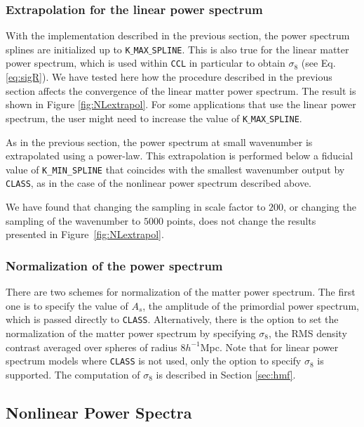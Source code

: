 \documentclass[\docopts]{\docclass}
\newcommand{\ccl}{{\tt CCL}\xspace}
\begin{document}
\subsubsection{Extrapolation for the linear power spectrum}
\label{sec:Lextrapol}

With the implementation described in the previous section, the power spectrum
splines are initialized up to {\tt K$\_$MAX$\_$SPLINE}. This is also true for
the linear matter power spectrum, which is used within \ccl in particular to
obtain $\sigma_8$ (see Eq. \ref{eq:sigR}). We have tested here how the procedure
described in the previous section affects the convergence of the linear
matter power spectrum. The result is shown in Figure \ref{fig:NLextrapol}. For
some applications that use the linear power spectrum, the user might need to
increase the value of {\tt K$\_$MAX$\_$SPLINE}.

As in the previous section, the power spectrum at small wavenumber is extrapolated
using a power-law. This extrapolation is performed below a fiducial value of
{\tt K\_MIN\_SPLINE} that coincides with the smallest wavenumber output by
{\tt CLASS}, as in the case of the nonlinear power spectrum described above.

We have found that changing the sampling in scale factor to $200$, or changing
the sampling of the wavenumber to $5000$ points, does not change the results
presented in Figure~\ref{fig:NLextrapol}.


\subsubsection{Normalization of the power spectrum}
\label{sec:PSnorm}

There are two schemes for normalization of the matter power spectrum. The first
one is to specify the value of $A_s$, the amplitude of the primordial power
spectrum, which is passed directly to {\tt CLASS}. Alternatively, there is the
option to set the normalization of the matter power spectrum by specifying
$\sigma_8$, the RMS density contrast averaged over spheres of radius
$8h^{-1}$Mpc. Note that for linear power spectrum models where {\tt CLASS} is not
used, only the option to specify $\sigma_8$ is supported. The computation of
$\sigma_8$ is described in Section \ref{sec:hmf}.

\subsection{Nonlinear Power Spectra}
\label{sec:Nonlinear_Pk}
\end{document}
